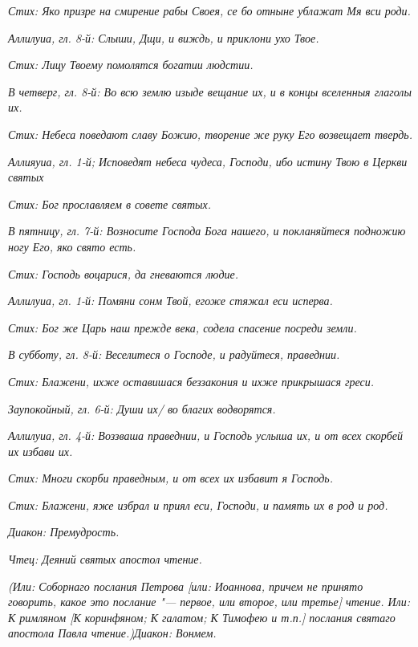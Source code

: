 \itshape Стих:\normalfont{} Яко призре на смирение рабы Своея, се бо отныне ублажат Мя вси роди.


\itshape Аллилуиа, гл. 8-й:\normalfont{} Слыши, Дщи, и виждь, и приклони ухо Твое.


\itshape Стих:\normalfont{} Лицу Твоему помолятся богатии людстии.


\itshape В четверг, гл. 8-й:\normalfont{} Во всю землю изыде вещание их, и в концы вселенныя глаголы их.


\itshape Стих:\normalfont{} Небеса поведают славу Божию, творение же руку Его возвещает твердь.


\itshape Аллияуиа, гл. 1-й;\normalfont{} Исповедят небеса чудеса, Господи, ибо истину Твою в Церкви святых


\itshape Стих:\normalfont{} Бог прославляем в совете святых.


\itshape В пятницу, гл. 7-й:\normalfont{} Возносите Господа Бога нашего, и покланяйтеся подножию ногу Его, яко свято есть.


\itshape Стих:\normalfont{} Господь воцарися, да гневаются людие.


\itshape Аллилуиа, гл. 1-й:\normalfont{} Помяни сонм Твой, егоже стяжал еси исперва.


\itshape Стих:\normalfont{} Бог же Царь наш прежде века, содела спасение посреди земли. 


\itshape В субботу, гл. 8-й:\normalfont{} Веселитеся о Господе, и радуйтеся, праведнии.


\itshape  Стих:\normalfont{} Блажени, ихже оставишася беззакония и ихже прикрышася греси.


\itshape  Заупокойный, гл. 6-й:\normalfont{} Души их/ во благих водворятся.


\itshape  Аллилуиа, гл. 4-й:\normalfont{} Воззваша праведнии, и Господь услыша их, и от всех скорбей их избави их.


\itshape  Стих:\normalfont{} Многи скорби праведным, и от всех их избавит я Господь.


\itshape  Стих:\normalfont{} Блажени, яже избрал и приял еси, Господи, и память их в род и род.


\itshape Диакон:\normalfont{} Премудрость.


\itshape  Чтец:\normalfont{} Деяний святых апостол чтение.


\itshape (Или:\normalfont{} Соборнаго послания Петрова \itshape [или:\normalfont{} Иоаннова\itshape , причем не принято говорить, какое это послание "--- первое, или второе, или третье\normalfont{}] чтение\itshape . Или:\normalfont{} К римляном [К коринфяном; К галатом; К Тимофе\itshape ю и т.п.\normalfont{}] послания святаго апостола Павла чтение.)\itshape  Диакон:\normalfont{} Вонмем.


